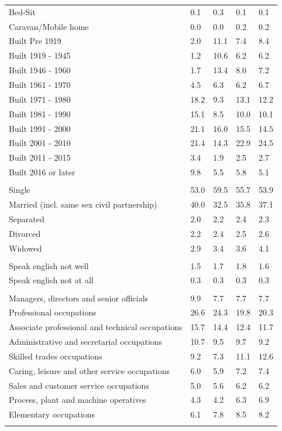 \documentclass{article}
\begin{document}
\begin{table}[h]
\begin{tabular}{KTTTT}
Bed-Sit & 0.1& 0.3& 0.1& 0.1\\
Caravan/Mobile home & 0.0& 0.0& 0.2& 0.2\\
    \hline
Built Pre 1919 &  2.0& 11.1&  7.4&  8.4\\
Built 1919 - 1945 &  1.2& 10.6&  6.2&  6.2\\
Built  1946 - 1960 &  1.7& 13.4&  8.0&  7.2\\
Built  1961 - 1970 & 4.5& 6.3& 6.2& 6.7\\
Built  1971 - 1980 & 18.2&  9.3& 13.1& 12.2\\
Built  1981 - 1990 & 15.1&  8.5& 10.0& 10.1\\
Built  1991 - 2000 & 21.1& 16.0& 15.5& 14.5\\
Built  2001 - 2010 & 21.4& 14.3& 22.9& 24.5\\
Built  2011 - 2015 & 3.4& 1.9& 2.5& 2.7\\
Built  2016 or later & 9.8& 5.5& 5.8& 5.1\\
\hline
    \\
    \hline
Single & 53.0& 59.5& 55.7& 53.9\\
Married (incl. same sex civil partnership) & 40.0& 32.5& 35.8& 37.1\\
Separated  & 2.0& 2.2& 2.4& 2.3\\
Divorced  & 2.2& 2.4& 2.5& 2.6\\
Widowed & 2.9& 3.4& 3.6& 4.1\\
\hline
    \\ 
    \hline
Speak english not well & 1.5& 1.7& 1.8& 1.6\\
Speak english not at all & 0.3& 0.3& 0.3& 0.3\\
\hline
    \\
    \hline
Managers, directors and senior officials & 9.9& 7.7& 7.7& 7.7\\
Professional occupations & 26.6& 24.3& 19.8& 20.3\\
Associate professional and technical occupations & 15.7& 14.4& 12.4& 11.7\\
Administrative and secretarial occupations & 10.7&  9.5&  9.7&  9.2\\
Skilled trades occupations &  9.2&  7.3& 11.1& 12.6\\
Caring, leisure and other service occupations & 6.0& 5.9& 7.2& 7.4\\
Sales and customer service occupations & 5.0& 5.6& 6.2& 6.2\\
Process, plant and machine operatives & 4.3& 4.2& 6.3& 6.9\\
Elementary occupations & 6.1& 7.8& 8.5& 8.2\\
\hline
\end{tabular}
\end{table}
\end{document}
